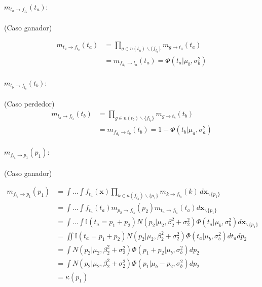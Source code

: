 \documentclass[11pt,twoside, spanish]{report} %
\begin{document}
\paragraph{$m_{t_a \rightarrow f_{t_a}}(t_a):$} (Caso ganador)

\begin{equation}
	\begin{split}
		m_{t_a \rightarrow f_{t_a}}(t_a) & = \prod_{g\in n(t_a)\backslash\{f_{t_a}\}} m_{g \rightarrow t_a} (t_a) \\
		&=  m_{f_{d_1} \rightarrow t_a} (t_a)=\Phi(t_a|\mu_b,\sigma_b^2)
	\end{split}
\end{equation}

\paragraph{$m_{t_b \rightarrow f_{t_b}}(t_b):$} (Caso perdedor)
\begin{equation}
	\begin{split}
		m_{t_b \rightarrow f_{t_b}}(t_b) & =\prod_{g\in n(t_b)\backslash\{f_{t_b}\}} m_{g \rightarrow t_b} (t_b)\\
		&=  m_{f_{d_1} \rightarrow t_b} (t_b)=1- \Phi(t_b|\mu_a,\sigma_a^2)
	\end{split}
\end{equation}

\paragraph{$m_{f_{t_a} \rightarrow p_1}(p_1):$} (Caso ganador)

\begin{equation}
	\begin{split}
		m_{f_{t_a} \rightarrow p_1}(p_1)  & = \int \dots \int f_{t_a}(\textbf{x}) \prod_{k\in n(f_{t_a})\backslash\{p_1\}} m_{k\rightarrow f_{t_a}}(k) \, d\textbf{x}_{\backslash \{p_1\} }  \\
		&= \int \dots \int f_{t_a}(t_a) m_{p_2\rightarrow f_{t_a}}(p_2)m_{t_a\rightarrow f_{t_a}}(t_a)d\textbf{x}_{\backslash \{p_1\} }\\
		&= \int \dots \int \mathbb{I}( t_a = p_1 + p_2) N(p_2| \mu_2, \beta_2^2 + \sigma_2^2 )  \Phi (t_a| \mu_b , \sigma_b^2 )  d\textbf{x}_{\backslash \{p_1\} }\\
		&= \iint \mathbb{I}( t_a = p_1 + p_2)  N(p_2| \mu_2, \beta_2^2 + \sigma_2^2 )  \Phi (t_a| \mu_b , \sigma_b^2 )  dt_a dp_2 \\
		&= \int   N(p_2| \mu_2, \beta_2^2 + \sigma_2^2 )  \Phi (p_1 + p_2| \mu_b , \sigma_b^2 )  dp_2 \\
		&= \int  N(p_2| \mu_2, \beta_2^2 + \sigma_2^2 )  \Phi (p_1 | \mu_b - p_2 , \sigma_b^2)  dp_2 \\
		&= \kappa(p_1)
	\end{split}
\end{equation}
\end{document}

